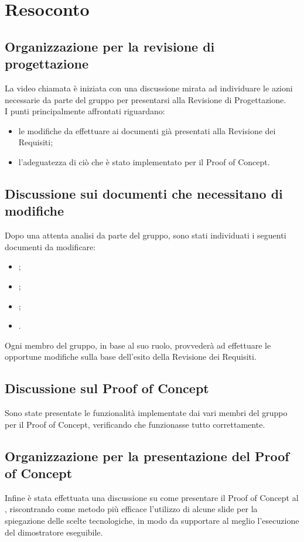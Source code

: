 \section{Resoconto}
\subsection{Organizzazione per la revisione di progettazione}
La video chiamata è iniziata con una discussione mirata ad individuare le azioni necessarie da parte del gruppo per presentarsi alla Revisione di Progettazione. \\
I punti principalmente affrontati riguardano:
\begin{itemize}
\item le modifiche da effettuare ai documenti già presentati alla Revisione dei Requisiti;
\item l'adeguatezza di ciò che è stato implementato per il Proof of Concept.
\end{itemize}
\subsection{Discussione sui documenti che necessitano di modifiche}
Dopo una attenta analisi da parte del gruppo, sono stati individuati i seguenti documenti da modificare:
\begin{itemize}
\item {};
\item {};
\item {};
\item {}.
\end{itemize}
Ogni membro del gruppo, in base al suo ruolo, provvederà ad effettuare le opportune modifiche sulla base dell'esito della Revisione dei Requisiti.
\subsection{Discussione sul Proof of Concept}
Sono state presentate le funzionalità implementate dai vari membri del gruppo per il Proof of Concept, verificando che funzionasse tutto correttamente.
\subsection{Organizzazione per la presentazione del Proof of Concept}
Infine è stata effettuata una discussione su come presentare il Proof of Concept al \CR , riscontrando come metodo più efficace l'utilizzo di alcune slide per la spiegazione delle scelte tecnologiche, in modo da supportare al meglio l'esecuzione del dimostratore eseguibile.